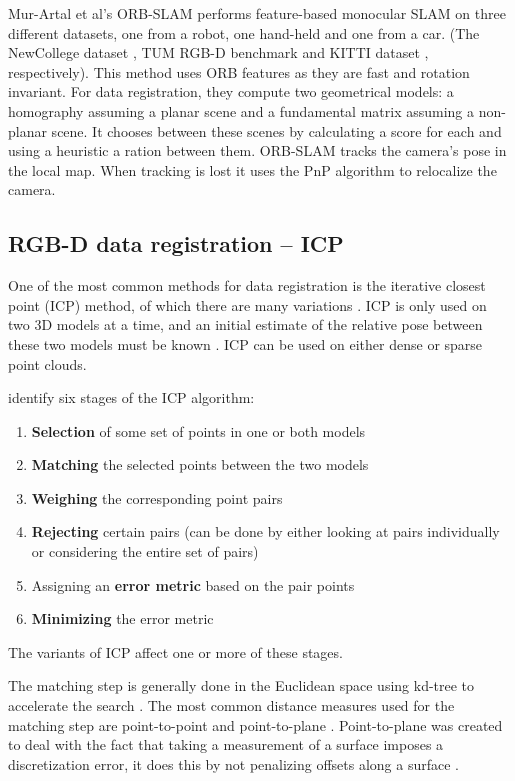 \documentclass[12pt,a4paper]{article}
\begin{document}
    Mur-Artal et al's ORB-SLAM \cite{mur2015orb} performs feature-based monocular SLAM on three different datasets, one from a robot, one hand-held and one from a car. (The NewCollege dataset \cite{smith2009new}, TUM RGB-D benchmark \cite{sturm2012benchmark} and KITTI dataset \cite{geiger2013vision}, respectively). This method uses ORB features \cite{rublee2011orb} as they are fast and rotation invariant. For data registration, they compute two geometrical models: a homography assuming a planar scene and a fundamental matrix assuming a non-planar scene. It chooses between these scenes by calculating a score for each and using a heuristic a ration between them. ORB-SLAM tracks the camera's pose in the local map. When tracking is lost it uses the PnP algorithm to relocalize the camera. 


  \subsection{RGB-D data registration -- ICP}
    \label{ssec: LR ICP}
    One of the most common methods for data registration is the iterative closest point (ICP) method, of which there are many variations \cite{pomerleau2013comparing}. ICP is only used on two 3D models at a time, and an initial estimate of the relative pose between these two models must be known \cite{rusinkiewicz2001efficient}. ICP can be used on either dense or sparse point clouds.
     
    \citet{rusinkiewicz2001efficient} identify six stages of the ICP algorithm:
    \begin{enumerate}
    \item{\textbf{Selection} of some set of points in one or both models}
    \item{\textbf{Matching} the selected points between the two models}
    \item{\textbf{Weighing} the corresponding point pairs}
    \item{\textbf{Rejecting} certain pairs (can be done by either looking at pairs individually or considering the entire set of pairs)}
    \item{Assigning an \textbf{error metric} based on the pair points}
    \item{\textbf{Minimizing} the error metric}
    \end{enumerate}
    The variants of ICP affect one or more of these stages.
     
    The matching step is generally done in the Euclidean space using kd-tree to accelerate the search \cite{pomerleau2013comparing}. The most common distance measures used for the matching step are point-to-point and point-to-plane \cite{pomerleau2013comparing}. Point-to-plane was created to deal with the fact that taking a measurement of a surface imposes a discretization error, it does this by not penalizing offsets along a surface \cite{segal2009generalized}.
     
\end{document}
